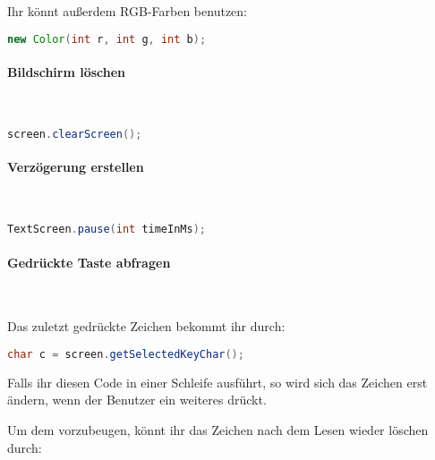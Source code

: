 \documentclass[12pt,a4paper]{article}
\begin{document}
Ihr könnt außerdem RGB-Farben benutzen:

\begin{tcolorbox}[frame empty,nobeforeafter,colback=gray!5]
\begin{lstlisting}[language=java,basicstyle=\ttfamily]
new Color(int r, int g, int b);
\end{lstlisting}
\end{tcolorbox}

\paragraph{Bildschirm löschen}\

\begin{tcolorbox}[frame empty,nobeforeafter,colback=gray!5]
\begin{lstlisting}[language=java,basicstyle=\ttfamily]
screen.clearScreen();
\end{lstlisting}
\end{tcolorbox}

\paragraph{Verzögerung erstellen}\

\begin{tcolorbox}[frame empty,nobeforeafter,colback=gray!5]
\begin{lstlisting}[language=java,basicstyle=\ttfamily]
TextScreen.pause(int timeInMs);
\end{lstlisting}
\end{tcolorbox}

\paragraph{Gedrückte Taste abfragen}\

Das zuletzt gedrückte Zeichen bekommt ihr durch:

\begin{tcolorbox}[frame empty,nobeforeafter,colback=gray!5]
\begin{lstlisting}[language=java,basicstyle=\ttfamily]
char c = screen.getSelectedKeyChar();
\end{lstlisting}
\end{tcolorbox}

Falls ihr diesen Code in einer Schleife ausführt, so wird sich das Zeichen erst ändern, wenn der Benutzer ein weiteres drückt.

Um dem vorzubeugen, könnt ihr das Zeichen nach dem Lesen wieder löschen durch:
\end{document}
